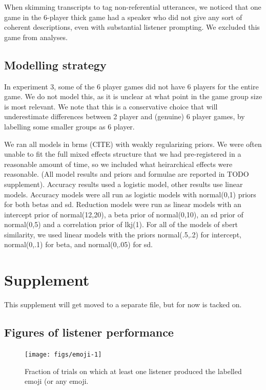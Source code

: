 \documentclass[
  english,
  a4paper,
]{article}
\begin{document}
When skimming transcripts to tag non-referential utterances, we noticed that one game in the 6-player thick game had a speaker who did not give any sort of coherent descriptions, even with substantial listener prompting. We excluded this game from analyses.

\hypertarget{modelling-strategy}{%
\subsection{Modelling strategy}\label{modelling-strategy}}

In experiment 3, some of the 6 player games did not have 6 players for the entire game. We do not model this, as it is unclear at what point in the game group size is most relevant. We note that this is a conservative choice that will underestimate differences between 2 player and (genuine) 6 player games, by labelling some smaller groups as 6 player.

We ran all models in brms (CITE) with weakly regularizing priors. We were often unable to fit the full mixed effects structure that we had pre-registered in a reasonable amount of time, so we included what heirarchical effects were reasonable. (All model results and priors and formulae are reported in TODO supplement). Accuracy results used a logistic model, other results use linear models. Accuracy models were all run as logistic models with normal(0,1) priors for both betas and sd. Reduction models were run as linear models with an intercept prior of normal(12,20), a beta prior of normal(0,10), an sd prior of normal(0,5) and a correlation prior of lkj(1). For all of the models of sbert similarity, we used linear models with the priors normal(.5,.2) for intercept, normal(0,.1) for beta, and normal(0,.05) for sd.

\hypertarget{supplement}{%
\section{Supplement}\label{supplement}}

This supplement will get moved to a separate file, but for now is tacked on.

\hypertarget{figures-of-listener-performance}{%
\subsection{Figures of listener performance}\label{figures-of-listener-performance}}

\begin{figure}[t!]

{\centering \texttt{[image: figs/emoji-1]} 

}

\caption{Fraction of trials on which at least one listener produced the labelled emoji (or any emoji.}\label{fig:emoji}
\end{figure}
\end{document}
